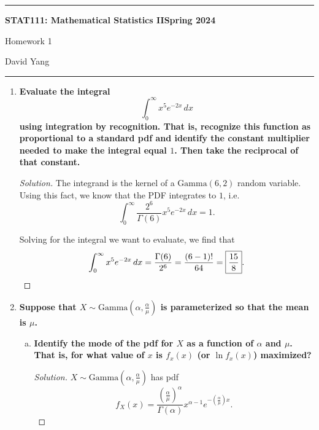 \documentclass[11pt]{article}
\newenvironment{solution}
  {\renewcommand\qedsymbol{$\blacksquare$}\begin{proof}[Solution]}
  {\end{proof}}
\begin{document}
	\hrule
	\begin{center}
        \textbf{STAT111: Mathematical Statistics II}\hfill \textbf{Spring 2024}\newline

		{\Large Homework 1}

		David Yang
	\end{center}

\hrule

\vspace{1em}

\begin{enumerate}
    \item \textbf{Evaluate the integral}
    \[
        \int_0^{\infty} x^5 e^{-2x} \, dx
    \] 
    \textbf{using integration by recognition. That is, recognize this function as proportional to a standard pdf 
    and identify the constant multiplier needed to make the integral equal $1$. Then take the reciprocal of that constant.}

    \begin{solution}
    The integrand is the kernel of a $\mathrm{Gamma}(6, 2)$ random variable. \\

    Using this fact, we know that the PDF integrates to $1$, i.e.
    \[
        \int_0^{\infty} \frac{2^6}{\Gamma(6)}x^5 e^{-2x} \, dx = 1.
    \] 
    
    Solving for the integral we want to evaluate, we find that
    \[
        \int_0^{\infty} x^5 e^{-2x} \, dx = \frac{\Gamma(6)}{2^6} = \frac{(6-1)!}{64} = \boxed{\frac{15}{8}}. \qedhere
    \] 
    \end{solution}

\newpage

    \item \textbf{Suppose that $X \sim \mathrm{Gamma}\left(\alpha, \frac{\alpha}{\mu}\right)$ is parameterized so that the mean is $\mu$.}
    
    \begin{enumerate}[a)]
        \item \textbf{Identify the mode of the pdf for $X$ as a function of $\alpha$ and $\mu$. That is, for what value of $x$ is $f_x(x)$ (or $\ln f_x(x)$) maximized?} 
    
        \begin{solution}
        $X \sim \mathrm{Gamma}\left(\alpha, \frac{\alpha}{\mu}\right)$ has pdf 
        \[
            f_X(x) = \frac{\left( \frac{\alpha}{\mu} \right)^{\alpha} }{\Gamma(\alpha)} x^{\alpha - 1} e^{-\left( \frac{\alpha}{\mu} \right)x}.
        \]


\end{solution}
\end{enumerate}
\end{enumerate}
\end{document}
